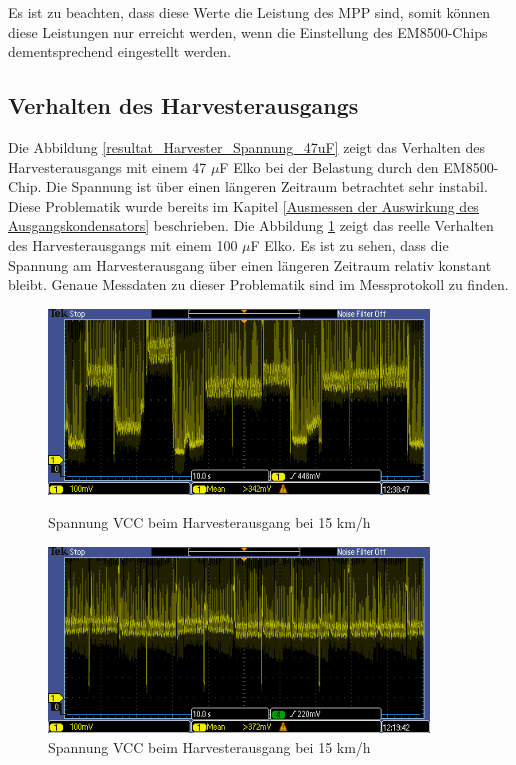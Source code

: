 Es ist zu beachten, dass diese Werte die Leistung des MPP sind, somit können diese Leistungen nur erreicht werden, wenn die Einstellung des EM8500-Chips dementsprechend eingestellt werden.


\subsection{Verhalten des Harvesterausgangs}

Die Abbildung \ref{resultat_Harvester_Spannung_47uF} zeigt das Verhalten des Harvesterausgangs mit einem 47 $\mu$F Elko bei der Belastung durch den EM8500-Chip. Die Spannung ist über einen längeren Zeitraum betrachtet sehr instabil. Diese Problematik wurde bereits im Kapitel \ref{Ausmessen der Auswirkung des Ausgangskondensators} beschrieben. Die Abbildung \ref{resultat_Harvester_Spannung_100uF} zeigt das reelle Verhalten des Harvesterausgangs mit einem 100 $\mu$F Elko. Es ist zu sehen, dass die Spannung am Harvesterausgang über einen längeren Zeitraum relativ konstant bleibt. Genaue Messdaten zu dieser Problematik sind im Messprotokoll  zu finden.

\begin{figure}[ht]
 \begin{minipage}[t]{0.5\textwidth}
    \includegraphics[width=0.9\textwidth]{4Resultate/imag/SpannungVCC_47uF.PNG} 
    \caption{Spannung VCC beim Harvesterausgang bei 15 km/h}
    \label{resultat_Harvester_Spannung_47uF}
 \end{minipage}
 \begin{minipage}[t]{0.5\textwidth}
    \includegraphics[width=0.9\textwidth]{4Resultate/imag/SpannungVCC_100uF.png} 
    \caption{Spannung VCC beim Harvesterausgang bei 15 km/h}
    \label{resultat_Harvester_Spannung_100uF}
 \end{minipage}
\end{figure}

